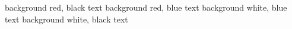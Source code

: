 \documentclass{article}
\begin{document}
\pagecolor{red}
background red, black text
\newpage
{\color{blue}
background red, blue text
\newpage
\pagecolor{white}
background white, blue text}
\newpage
background white, black text
\end{document}
